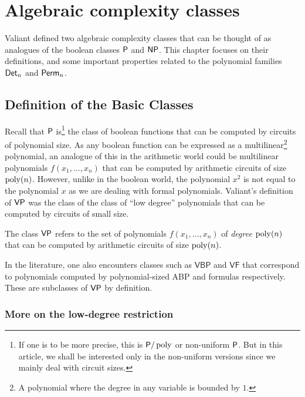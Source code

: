 \chapter{Algebraic complexity classes} \label{chap-vpvnp}

Valiant \cite{v79} defined two algebraic complexity classes that can be thought of as analogues of the boolean classes $\P$ and $\mathsf{NP}$. 
This chapter focuses on their definitions, and some important properties related to the polynomial families $\operatorname{\mathsf{Det}}_n$ and $\operatorname{\mathsf{Perm}}_n$. 

\section{Definition of the Basic Classes}

Recall that $\P$ is\footnote{If one is to be more precise, this is $\mathsf{P}/\operatorname{poly}$ or non-uniform $\P$. 
But in this article, we shall be interested only in the non-uniform versions since we mainly deal with circuit sizes.} the class of boolean functions that can be computed by circuits of polynomial size. 
As any boolean function can be expressed as a multilinear\footnote{A polynomial where the degree in any variable is bounded by $1$.} polynomial, an analogue of this in the arithmetic world could be multilinear polynomials $f(x_1,\dots, x_n)$ that can be computed by arithmetic circuits of size $\operatorname{poly}(n)$. 
However, unlike in the boolean world, the polynomial $x^2$ is not equal to the polynomial $x$ as we are dealing with formal polynomials. 
Valiant's definition of $\mathsf{VP}$ was the class of the class of ``low degree'' polynomials that can be computed by circuits of small size. 

\begin{definition}[Valiant's $\P$]\label{defn:vp}
The class $\mathsf{VP}$ refers to the set of polynomials $f(x_1,\dots, x_n)$ of \emph{degree $\operatorname{poly}(n)$} that can be computed by arithmetic circuits of size $\operatorname{poly}(n)$. 
\end{definition}

In the literature, one also encounters classes such as $\mathsf{VBP}$ and $\mathsf{VF}$ that correspond to polynomials computed by polynomial-sized ABP and formulas respectively. 
These are subclasses of $\mathsf{VP}$ by definition. 


\subsection*{More on the low-degree restriction}

